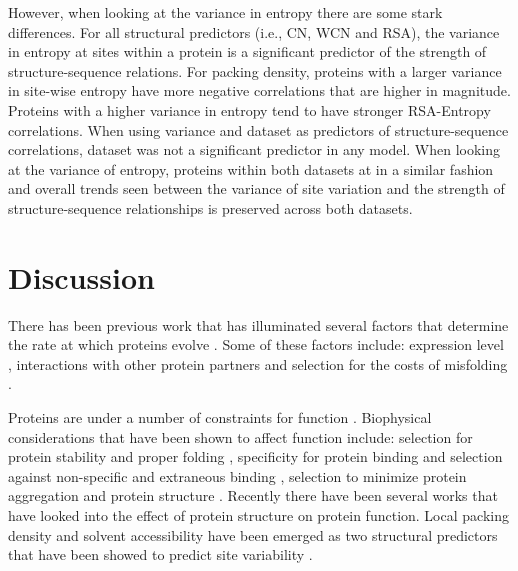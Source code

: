 \documentclass[12pt]{article}
\begin{document}
\indent However, when looking at the variance in entropy there are some stark differences. For all structural predictors (i.e., CN, WCN and RSA), the variance in entropy at sites within a protein is a significant predictor of the strength of structure-sequence relations. For packing density, proteins with a larger variance in site-wise entropy have more negative correlations that are higher in magnitude. Proteins with a higher variance in entropy tend to have stronger RSA-Entropy correlations. When using variance and dataset as predictors of structure-sequence correlations, dataset was not a significant predictor in any model. When looking at the variance of entropy, proteins within both datasets at in a similar fashion and overall trends seen between the variance of site variation and the strength of structure-sequence relationships is preserved across both datasets. 

\section{Discussion}
\label{sec:dcr}

There has been previous work that has illuminated several factors that determine the rate at which proteins evolve \citep{Fraseretal2002, Drummondetal2008, Wilkeetal2010, Yangetal2012}. Some of these factors include: expression level \citep{Drummondetal2008, Wilkeetal2010, Paletal2001, Subramanianetal2004}, interactions with other protein partners \citep{Fraseretal2002, Yangetal2012, Minterisetal2005, Pangetal2010}  and selection for the costs of misfolding \citep{Drummondetal2005}. 

\indent Proteins are under a number of constraints for function \citep{Liberlesetal2009}. Biophysical considerations that have been shown to affect function include: selection for protein stability and proper folding \citep{Drummondetal2005}, specificity for protein binding \citep{Zarrinparetal2003}  and selection against non-specific and extraneous binding \citep{Levyetal2012}, selection to minimize protein aggregation \citep{DePristoetal2005}  and protein structure \citep{Fransozaetal2009, Fransozaetal2012, Yehetal2014a, Yehetal2014b, Shahmoradietal2014, Echaveetal2015, Huangetal2014}. Recently there have been several works that have looked into the effect of protein structure on protein function. Local packing density and solvent accessibility have been emerged as two structural predictors that have been showed to predict site variability \citep{Yehetal2014a, Yehetal2014b, Shahmoradietal2014, Fransozaetal2009, Bustamanteetal2000}. 
\end{document}
